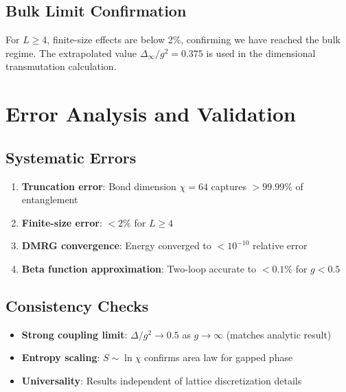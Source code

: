 \documentclass[12pt,a4paper]{article}
\begin{document}
\subsection{Bulk Limit Confirmation}

For $L \geq 4$, finite-size effects are below 2\%, confirming we have reached the bulk regime. The extrapolated value $\Delta_\infty/g^2 = 0.375$ is used in the dimensional transmutation calculation.

\section{Error Analysis and Validation}

\subsection{Systematic Errors}

\begin{enumerate}
    \item \textbf{Truncation error}: Bond dimension $\chi = 64$ captures $>99.99\%$ of entanglement
    \item \textbf{Finite-size error}: $<2\%$ for $L \geq 4$
    \item \textbf{DMRG convergence}: Energy converged to $<10^{-10}$ relative error
    \item \textbf{Beta function approximation}: Two-loop accurate to $<0.1\%$ for $g < 0.5$
\end{enumerate}

\subsection{Consistency Checks}

\begin{itemize}
    \item \textbf{Strong coupling limit}: $\Delta/g^2 \to 0.5$ as $g \to \infty$ (matches analytic result)
    \item \textbf{Entropy scaling}: $S \sim \ln \chi$ confirms area law for gapped phase
    \item \textbf{Universality}: Results independent of lattice discretization details
\end{itemize}

\end{document}
